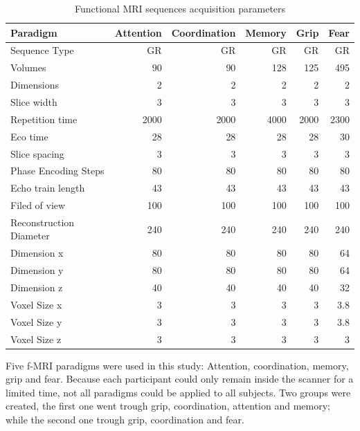 \begin{table}
	\centering
	\footnotesize
		\begin{tabular}{l|rrrrr}

	Paradigm &Attention	&Coordination	&Memory	&Grip &Fear\\ \hline
	Sequence Type	&GR	&GR	&GR	&GR &GR\\
	Volumes	&90	&90	&128	&125 &495\\
	Dimensions	&2	&2	&2	&2 &2\\
	Slice width	&3	&3	&3	&3 &3\\ \hline
	Repetition time	&2000	&2000	&4000	&2000 &2300\\
	Eco time	&28	&28	&28	&28 &30\\
	Slice spacing	&3	&3	&3	&3 &3\\
	Phase Encoding Steps	&80	&80	&80	&80 &80\\
	Echo train length	&43	&43	&43	&43 &43\\
	Filed of view	&100	&100	&100	&100 &100\\
	Reconstruction	Diameter&240	&240	&240	&240 &240\\ \hline
	Dimension x &80	&80 &80 &80 &64 \\
	Dimension y &80	&80 &80 &80 &64 \\
	Dimension z &40	&40 &40 &40 &32 \\ \hline
	Voxel Size x	&3 &3 &3 &3 &3.8 \\
	Voxel Size y	&3 &3 &3 &3 &3.8 \\
	Voxel Size z	&3 &3 &3 &3 &3 \\
		\end{tabular}
	\caption{Functional MRI sequences acquisition parameters}
	\label{tab_fmri_params}
\end{table}

Five f-MRI paradigms were used in this study: Attention, coordination, memory, grip and fear. Because each participant could only remain inside the scanner for a limited time, not all paradigms could be applied to all subjects. Two groups were created, the first one went trough grip, coordination, attention and memory; while the second one trough grip, coordination and fear. 

